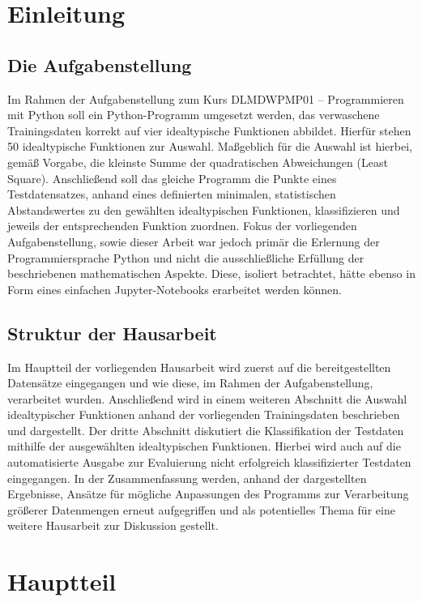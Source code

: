 \chapter{Einleitung}

\section{Die Aufgabenstellung}

Im Rahmen der Aufgabenstellung zum Kurs DLMDWPMP01 – Programmieren mit Python soll ein Python-Programm umgesetzt werden, das verwaschene Trainingsdaten korrekt auf vier idealtypische Funktionen abbildet. Hierfür stehen 50 idealtypische Funktionen zur Auswahl. Maßgeblich für die Auswahl ist hierbei, gemäß Vorgabe, die kleinste Summe der quadratischen Abweichungen (Least Square).
Anschließend soll das gleiche Programm die Punkte eines Testdatensatzes, anhand eines definierten minimalen, statistischen Abstandswertes zu den gewählten idealtypischen Funktionen, klassifizieren und jeweils der entsprechenden Funktion zuordnen.
Fokus der vorliegenden Aufgabenstellung, sowie dieser Arbeit war jedoch primär die Erlernung der Programmiersprache Python und nicht die ausschließliche Erfüllung der beschriebenen mathematischen Aspekte. Diese, isoliert betrachtet, hätte ebenso in Form eines einfachen Jupyter-Notebooks erarbeitet werden können.


\section{Struktur der Hausarbeit}

Im Hauptteil der vorliegenden Hausarbeit wird zuerst auf die bereitgestellten Datensätze eingegangen und wie diese, im Rahmen der Aufgabenstellung, verarbeitet wurden.
Anschließend wird in einem weiteren Abschnitt die Auswahl idealtypischer Funktionen anhand der vorliegenden Trainingsdaten beschrieben und dargestellt.
Der dritte Abschnitt diskutiert die Klassifikation der Testdaten mithilfe der ausgewählten idealtypischen Funktionen. Hierbei wird auch auf die automatisierte Ausgabe zur Evaluierung nicht erfolgreich klassifizierter Testdaten eingegangen.
In der Zusammenfassung werden, anhand der dargestellten Ergebnisse, Ansätze für mögliche Anpassungen des Programms zur Verarbeitung größerer Datenmengen erneut aufgegriffen und als potentielles Thema für eine weitere Hausarbeit zur Diskussion gestellt.

\chapter{Hauptteil}

